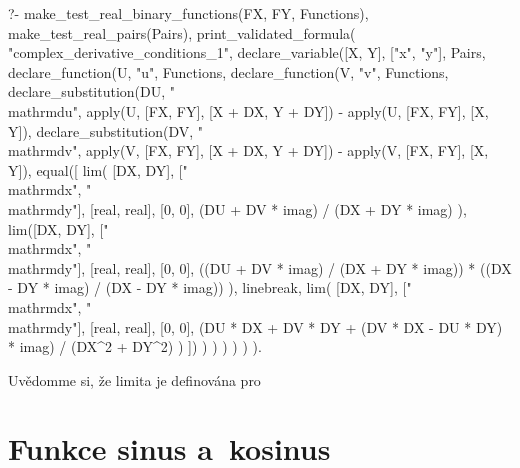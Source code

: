 \begin{prolog}
?-	make_test_real_binary_functions(FX, FY, Functions),
	make_test_real_pairs(Pairs),
	print_validated_formula(
		"complex_derivative_conditions_1",
		declare_variable([X, Y], ["x", "y"], Pairs,
			declare_function(U, "u", Functions,
				declare_function(V, "v", Functions,
					declare_substitution(DU, "\\mathrm{d}u", apply(U, [FX, FY], [X + DX, Y + DY]) - apply(U, [FX, FY], [X, Y]),
						declare_substitution(DV, "\\mathrm{d}v", apply(V, [FX, FY], [X + DX, Y + DY]) - apply(V, [FX, FY], [X, Y]),
							equal([
								lim(
									[DX, DY], ["\\mathrm{d}x", "\\mathrm{d}y"], [real, real], [0, 0],
									(DU + DV * imag) / (DX + DY * imag)
								),
								lim([DX, DY], ["\\mathrm{d}x", "\\mathrm{d}y"], [real, real], [0, 0],
									((DU + DV * imag) / (DX + DY * imag)) * ((DX - DY * imag) / (DX - DY * imag))	
								),
								linebreak,
								lim(
									[DX, DY], ["\\mathrm{d}x", "\\mathrm{d}y"], [real, real], [0, 0],
									(DU * DX + DV * DY + (DV * DX - DU * DY) * imag) / (DX^2 + DY^2)
								)
							])
						)
					)
				)
			)
		)
	).
\end{prolog}

Uvědomme si, že limita je definována pro 

\section{Funkce sinus a~kosinus}
